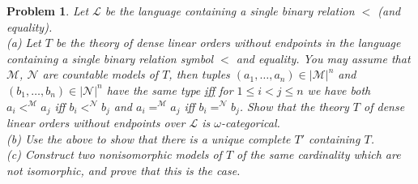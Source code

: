 \documentclass{article}
\newtheorem{problem}{Problem}
\begin{document}
\begin{problem}
\label{dense}
Let $\mathcal{L}$ be the language containing a single binary relation $<$ (and equality).\\
(a) Let $T$ be the theory of dense linear orders without endpoints in the language containing a single binary relation symbol $<$ and equality. You may assume that $\mathcal{M}$, $\mathcal{N}$ are countable models of $T$, then tuples $(a_1, \dots , a_n) \in |\mathcal{M}|^n$ and $(b_1, \dots , b_n) \in |\mathcal{N}|^n$ have the same type \underline{iff} for $1 \leq i < j \leq n$ we have both $a_i <^{\mathcal{M}} a_j$ iff $b_i <^{\mathcal{N}} b_j$ and $a_i =^{\mathcal{M}} a_j$ iff $b_i =^{\mathcal{N}} b_j$. Show that the theory $T$ of dense linear orders without endpoints over $\mathcal{L}$ is $\omega$-categorical.\\
(b) Use the above to show that there is a \emph{unique} complete $T'$ containing $T$.\\
(c) Construct two nonisomorphic models of $T$ of the same cardinality which are not isomorphic, and prove that this is the case.
\end{problem}
\end{document}
